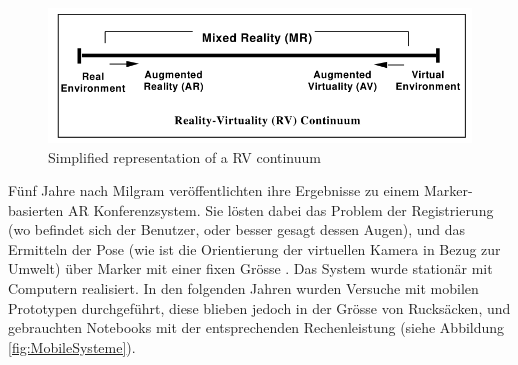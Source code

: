 \documentclass[a4paper]{scrreprt}
\begin{document}
\begin{figure}[htb]
	\includegraphics[keepaspectratio, width=\textwidth]{MR_milgram.png}
	\caption{Simplified representation of a RV continuum \parencite{Milgram1994}}
	\label{fig:RVContiinum}
\end{figure}

Fünf Jahre nach Milgram veröffentlichten \citeauthor{Kato1999} ihre Ergebnisse zu einem Marker-basierten AR Konferenzsystem. Sie lösten dabei das Problem der Registrierung (wo befindet sich der Benutzer, oder besser gesagt dessen Augen), und das Ermitteln der Pose (wie ist die Orientierung der virtuellen Kamera in Bezug zur Umwelt) über Marker mit einer fixen Grösse \parencite{Kato1999}. Das System wurde stationär mit Computern realisiert. In den folgenden Jahren wurden Versuche mit  mobilen Prototypen durchgeführt, diese blieben jedoch in der Grösse von Rucksäcken, und gebrauchten Notebooks mit der entsprechenden Rechenleistung (siehe Abbildung \ref{fig:MobileSysteme}).
\end{document}
